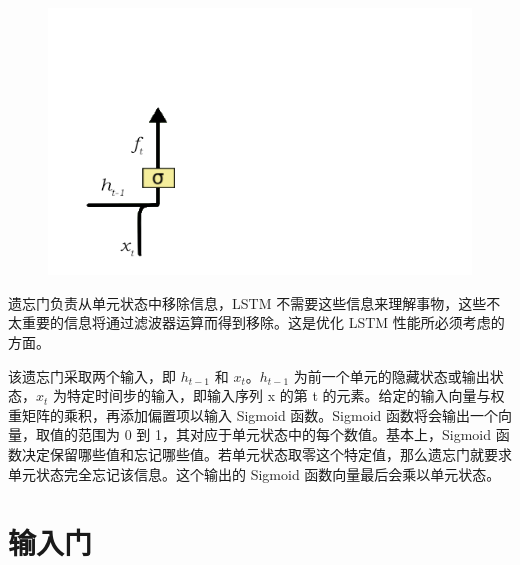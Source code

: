 \documentclass{article}
\begin{document}
\begin{figure}[H]
	\centering
	\includegraphics[scale=0.3]{3.png}
\end{figure}
遗忘门负责从单元状态中移除信息，LSTM 不需要这些信息来理解事物，这些不太重要的信息将通过滤波器运算而得到移除。这是优化 LSTM 性能所必须考虑的方面。

该遗忘门采取两个输入，即 $h_{t-1}$ 和 $x_t$。$h_{t-1}$ 为前一个单元的隐藏状态或输出状态，$x_t$ 为特定时间步的输入，即输入序列 x 的第 t 的元素。给定的输入向量与权重矩阵的乘积，再添加偏置项以输入 Sigmoid 函数。Sigmoid 函数将会输出一个向量，取值的范围为 0 到 1，其对应于单元状态中的每个数值。基本上，Sigmoid 函数决定保留哪些值和忘记哪些值。若单元状态取零这个特定值，那么遗忘门就要求单元状态完全忘记该信息。这个输出的 Sigmoid 函数向量最后会乘以单元状态。
\section{输入门}
\end{document}
